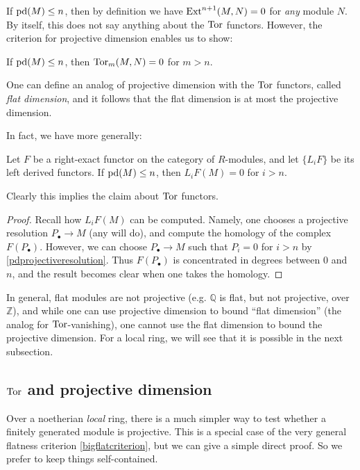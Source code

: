If $\mathrm{pd}(M) \leq n$, then by definition we have $\operatorname{Ext}^{n+1}(M, N) = 0$ for
\emph{any} module $N$. By itself, this does not say anything about the $\operatorname{Tor}$
functors.
However, the criterion for projective dimension enables us to show:

\begin{proposition} \label{pdfd}
If $\mathrm{pd}(M) \leq n$, then $\operatorname{Tor}_m(M, N) = 0$ for $m > n$.
\end{proposition} 
One can define an analog of projective dimension with the $\operatorname{Tor}$ functors,
called \emph{flat dimension}, and it follows that the flat dimension is at most
the projective dimension.

In fact, we have more generally:
\begin{proposition} 
Let $F$ be a right-exact functor on the category of $R$-modules, and let $\{L_i
F\}$ be its left derived functors. 
If $\mathrm{pd}(M) \leq n$, then $L_i F(M) = 0$ for $i > n$.
\end{proposition} 

Clearly this implies the claim about $\operatorname{Tor}$ functors.
\begin{proof} 
Recall how $L_i F(M)$ can be computed. Namely, one chooses a projective
resolution $P_\bullet \to M$ (any will do), and compute the homology of the
complex 
$F(P_\bullet)$. However, we can choose $P_\bullet \to M$ such that $P_i = 0$
for $i > n$ by \cref{pdprojectiveresolution}. Thus $F(P_\bullet)$ is
concentrated in degrees between $0$ and $n$, and the result becomes clear when
one takes the homology.
\end{proof} 

In general, flat modules are not projective (e.g. $\mathbb{Q}$ is flat, but not
projective, over $\mathbb{Z}$), and while one can use projective dimension to
bound ``flat dimension'' (the analog for $\operatorname{Tor}$-vanishing), one cannot use the
flat dimension to bound the projective dimension. For a local ring, we will see
that it is possible in the next subsection. 

\subsection{$\operatorname{Tor}$ and projective dimension}

Over  a noetherian \emph{local} ring, there is a much simpler way to test whether a
finitely generated module is projective. This is a special case of the very
general flatness criterion \cref{bigflatcriterion}, but we can give a simple
direct proof. So we prefer to keep things self-contained. 


